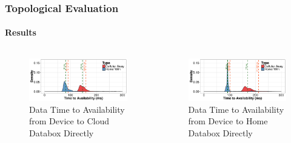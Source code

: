 \documentclass[aspectratio=169]{beamer}
\begin{document}
\begin{frame}
	\frametitle{Topological Evaluation}
	\framesubtitle{Results}

	\begin{columns}[c]
		\begin{figure}
			\centering
			\includegraphics[width=\columnwidth]{acc-inout-cloud}
			\caption{Data Time to Availability from Device to Cloud Databox Directly}
		\end{figure}
		\begin{figure}
			\centering
			\includegraphics[width=\columnwidth]{acc-inout-home}
			\caption{Data Time to Availability from Device to Home Databox Directly}
		\end{figure}
	\end{columns}
	\centering
\end{frame}
\end{document}
